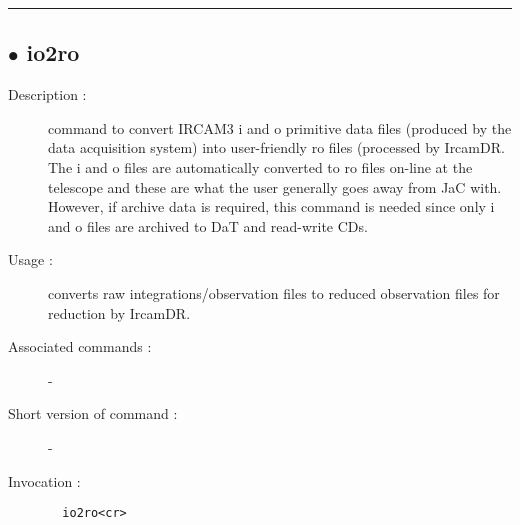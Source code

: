 \hrule \subsection*{$\bullet$ io2ro}
\begin{description}
\item[Description :] command to convert {\sc IRCAM3} i and o primitive data files (produced
by the data acquisition system) into user-friendly ro files (processed by
IrcamDR.  The i and o files are automatically converted to ro files
on-line at the telescope and these are what the user generally goes away
from JaC with.  However, if archive data is required, this command is
needed since only i and o files are archived to DaT and read-write CDs.
\item[Usage :] converts raw integrations/observation files to reduced
observation files for reduction by IrcamDR.
\item[Associated commands :] -
\item[Short version of command :] -
\item[Invocation :]

\verb+  io2ro<cr> +\end{description}

